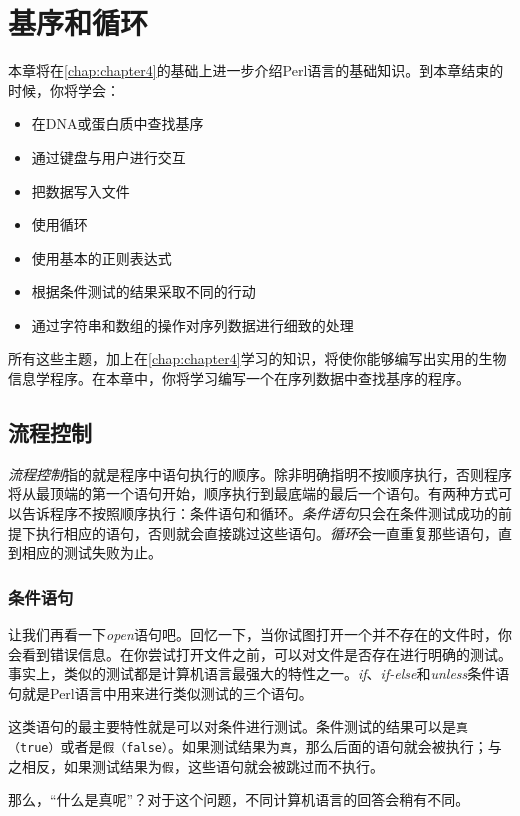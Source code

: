 \chapter{基序和循环}
\label{chap:chapter5}
\minitoc

本章将在\autoref{chap:chapter4}的基础上进一步介绍Perl语言的基础知识。到本章结束的时候，你将学会：

\begin{itemize}
  \item 在DNA或蛋白质中查找基序
  \item 通过键盘与用户进行交互
  \item 把数据写入文件
  \item 使用循环
  \item 使用基本的正则表达式
  \item 根据条件测试的结果采取不同的行动
  \item 通过字符串和数组的操作对序列数据进行细致的处理
\end{itemize}

所有这些主题，加上在\autoref{chap:chapter4}学习的知识，将使你能够编写出实用的生物信息学程序。在本章中，你将学习编写一个在序列数据中查找基序的程序。

\section{流程控制}
\textit{流程控制}指的就是程序中语句执行的顺序。除非明确指明不按顺序执行，否则程序将从最顶端的第一个语句开始，顺序执行到最底端的最后一个语句。有两种方式可以告诉程序不按照顺序执行：条件语句和循环。\textit{条件语句}只会在条件测试成功的前提下执行相应的语句，否则就会直接跳过这些语句。\textit{循环}会一直重复那些语句，直到相应的测试失败为止。

\subsection{条件语句}
让我们再看一下\textit{open}语句吧。回忆一下，当你试图打开一个并不存在的文件时，你会看到错误信息。在你尝试打开文件之前，可以对文件是否存在进行明确的测试。事实上，类似的测试都是计算机语言最强大的特性之一。\textit{if}、\textit{if-else}和\textit{unless}条件语句就是Perl语言中用来进行类似测试的三个语句。

这类语句的最主要特性就是可以对条件进行测试。条件测试的结果可以是\verb|真（true）|或者是\verb|假（false）|。如果测试结果为\verb|真|，那么后面的语句就会被执行；与之相反，如果测试结果为\verb|假|，这些语句就会被跳过而不执行。

那么，“什么是真呢”？对于这个问题，不同计算机语言的回答会稍有不同。

